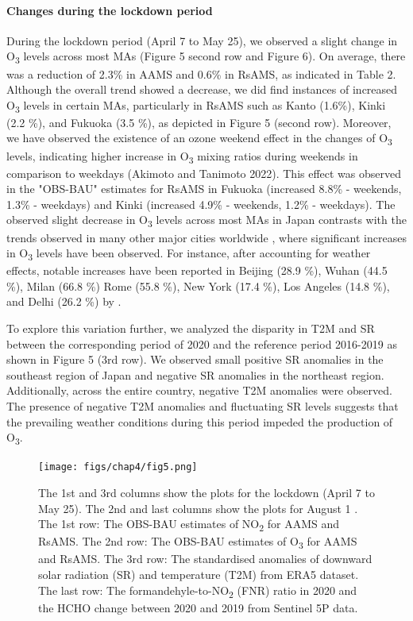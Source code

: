 \paragraph*{Changes during the lockdown period}
During the lockdown period (April 7 to May 25), we observed a slight change in O\textsubscript{3} levels across most MAs (Figure 5 second row and Figure 6). On average, there was a reduction of 2.3\% in AAMS and 0.6\% in RsAMS, as indicated in Table 2. Although the overall trend showed a decrease, we did find instances of increased O\textsubscript{3} levels in certain MAs, particularly in RsAMS such as Kanto (1.6\%), Kinki (2.2 \%), and Fukuoka (3.5 \%), as depicted in Figure 5 (second row). Moreover, we have observed the existence of an ozone weekend effect in the changes of O\textsubscript{3} levels, indicating higher increase in O\textsubscript{3} mixing ratios during weekends in comparison to weekdays (Akimoto and Tanimoto 2022). This effect was observed in the "OBS-BAU" estimates for RsAMS in Fukuoka (increased 8.8\% - weekends, 1.3\% - weekdays) and Kinki (increased 4.9\% - weekends, 1.2\% - weekdays).
The observed slight decrease in O\textsubscript{3} levels across most MAs in Japan contrasts with the trends observed in many other major cities worldwide \citep{shi2021abrupt,grange2021covid}, where significant increases in O\textsubscript{3} levels have been observed. For instance, after accounting for weather effects, notable increases have been reported in Beijing (28.9 \%), Wuhan (44.5 \%), Milan (66.8 \%) Rome (55.8 \%), New York (17.4 \%), Los Angeles (14.8 \%), and Delhi (26.2 \%) by \citep{shi2021abrupt}.\par
To explore this variation further, we analyzed the disparity in T2M and SR between the corresponding period of 2020 and the reference period 2016-2019 as shown in Figure 5 (3rd row). We observed small positive SR anomalies in the southeast region of Japan and negative SR anomalies in the northeast region. Additionally, across the entire country, negative T2M anomalies were observed. The presence of negative T2M anomalies and fluctuating SR levels suggests that the prevailing weather conditions during this period impeded the production of O\textsubscript{3}. \par

\begin{figure}[p]
    \centering
    \texttt{[image: figs/chap4/fig5.png]}
    \caption[NO\textsubscript{2}, O\textsubscript{3}, SR, T2M, FNR, and HCHO variations in 2020]{The 1st and 3rd columns show the plots for the lockdown (April 7 to May 25). The 2nd and last columns show the plots for August 1 . The 1st row: The OBS-BAU estimates of NO\textsubscript{2} for AAMS and RsAMS. The 2nd row: The OBS-BAU estimates of O\textsubscript{3} for AAMS and RsAMS. The 3rd row: The standardised anomalies of downward solar radiation (SR) and temperature (T2M) from ERA5 dataset. The last row: The formandehyle-to-NO\textsubscript{2} (FNR) ratio in 2020 and the HCHO change between 2020 and 2019 from Sentinel 5P data.}
    \label{fig:chap4_fig5}
\end{figure}

